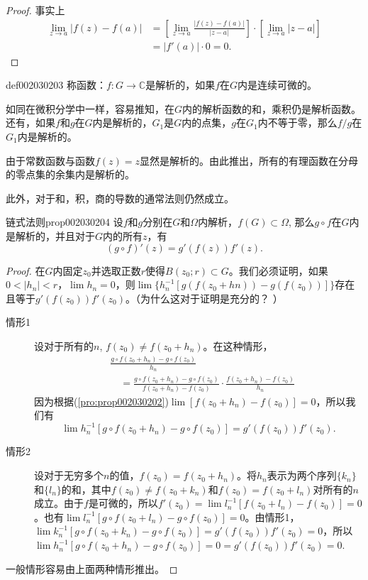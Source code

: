 \begin{proof}
事实上
\[
\begin{aligned}
\lim_{z \to a}{|f(z)-f(a)|} &=[\lim_{z \to a}{\frac{|f(z)-f(a)|}{|z-a|}}] \cdot [\lim_{z \to a}{|z-a|}] \\
&=|f'(a)| \cdot 0 = 0.
\end{aligned}
\]
\end{proof}

\begin{definition}{}{def002030203}
称函数：$f: G \to \mathbb{C}$是解析的，如果$f$在$G$内是连续可微的。
\end{definition}

如同在微积分学中一样，容易推知，在$G$内的解析函数的和，乘积仍是解析函数。还有，如果$f$和$g$在$G$内是解析的，$G_1$是$G$内的点集，$g$在$G_1$内不等于零，那么$f/g$在$G_1$内是解析的。

由于常数函数与函数$f(z)=z$显然是解析的。由此推出，所有的有理函数在分母的零点集的余集内是解析的。

此外，对于和，积，商的导数的通常法则仍然成立。
\begin{proposition}{链式法则}{prop002030204}
设$f$和$g$分别在$G$和$\Omega$内解析，$f(G) \subset \Omega$, 那么$g \circ f$在$G$内是解析的，并且对于$G$内的所有$z$，有
\[
(g \circ f)'(z) = g'(f(z))f'(z).
\]
\end{proposition}

\begin{proof}
在$G$内固定$z_0$并选取正数$r$使得$B(z_0; r) \subset G$。我们必须证明，如果$0 < |h_n| < r$，$\lim{h_n} = 0$，则$\lim\{h_n^{-1}[g(f(z_0+hn)) - g(f(z_0))]\}$存在且等于$g'(f(z_0))f'(z_0)$。（为什么这对于证明是充分的？ ）

\begin{description}
\item[情形1]设对于所有的$n$, $f(z_0) \neq f(z_0 + h_n)$。在这种情形，
\[
\begin{aligned}
&\frac{g \circ f(z_0 + h_n) - g \circ f(z_0)}{h_n} \\
&\quad = \frac{g \circ f(z_0 + h_n) - g \circ f(z_0)}{f(z_0+h_n) - f(z_0)} \cdot \frac{f(z_0+h_n) - f(z_0)}{h_n}
\end{aligned}
\]
因为根据(\ref{pro:prop002030202})$\lim{[f(z_0 + h_n) - f(z_0)]} = 0$，所以我们有
\[\lim{h_n^{-1}[g \circ f(z_0 + h_n) - g \circ f(z_0)]} = g'(f(z_0))f'(z_0).
\]
\item[情形2]设对于无穷多个$n$的值，$f(z_0) = f(z_0 + h_n)$。将$h_n$表示为两个序列$\{k_n\}$和$\{l_n\}$的和，其中$f(z_0) \neq f(z_0 + k_n)$和$f(z_0) = f(z_0 + l_n)$对所有的$n$成立。由于$f$是可微的，所以$f'(z_0) = \lim{l_n^{-1}[f(z_0 + l_n) - f(z_0)]} = 0$。也有$\lim{l_n^{-1}[g \circ f(z_0 + l_n) - g \circ f(z_0)]} = 0$。由情形1，$\lim{k_n^{-1}[g \circ f(z_0+k_n) - g \circ f(z_0)]} = g'(f(z_0))f'(z_0) = 0$，所以$\lim{h_n^{-1}[g \circ f(z_0+h_n) - g \circ f(z_0)]} = 0 = g'(f(z_0))f'(z_0) = 0$.
\end{description}
一般情形容易由上面两种情形推出。
\end{proof}

